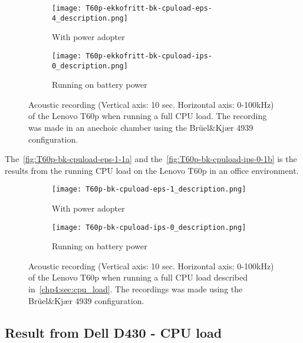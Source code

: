 \begin{figure}[ht]
	\begin{subfigure}{0.5\textwidth}
	    \centering
	    \texttt{[image: T60p-ekkofritt-bk-cpuload-eps-4\_description.png]}
	    \caption{With power adopter}
	    \label{fig:T60p-ekkofritt-bk-cpuload-eps-4}
    \end{subfigure}
    \begin{subfigure}{0.5\textwidth}
	    \centering
	    \texttt{[image: T60p-ekkofritt-bk-cpuload-ips-0\_description.png]}
	    \caption{Running on battery power}
	    \label{fig:T60p-ekkofritt-bk-cpuload-ips-0}
    \end{subfigure}
    \caption{Acoustic recording (Vertical axis: 10 sec. Horizontal axis: 0-100kHz) of the Lenovo T60p when running a full CPU load. The recording was made in an anechoic chamber using the Brüel\&Kjær 4939 configuration.}
	\label{fig:T60p-ekkofritt-bk-cpuload}
\end{figure}
The~\autoref{fig:T60p-bk-cpuload-eps-1-1a} and the~\autoref{fig:T60p-bk-cpuload-ips-0-1b} is the results from the running CPU load on the Lenovo T60p in an office environment. 
\begin{figure}[ht]
	\begin{subfigure}{0.5\textwidth}
	    \centering
	    \texttt{[image: T60p-bk-cpuload-eps-1\_description.png]}
	    \caption{With power adopter}
	    \label{fig:T60p-bk-cpuload-eps-1-1a}
    \end{subfigure}
    \begin{subfigure}{0.5\textwidth}
	    \centering
	    \texttt{[image: T60p-bk-cpuload-ips-0\_description.png]}
	    \caption{Running on battery power}
	    \label{fig:T60p-bk-cpuload-ips-0-1b}
    \end{subfigure}
    \caption{Acoustic recording (Vertical axis: 10 sec. Horizontal axis: 0-100kHz) of the Lenovo T60p when running a full CPU load described in~\autoref{chp4:sec:cpu_load}. The recordings was made using the Brüel\&Kjær 4939 configuration. }
	\label{fig:T60p-bk-cpuload}
\end{figure}


\subsection{Result from Dell D430 - CPU load}\label{chp5:subsec:d430_bk_results_cpuload}


